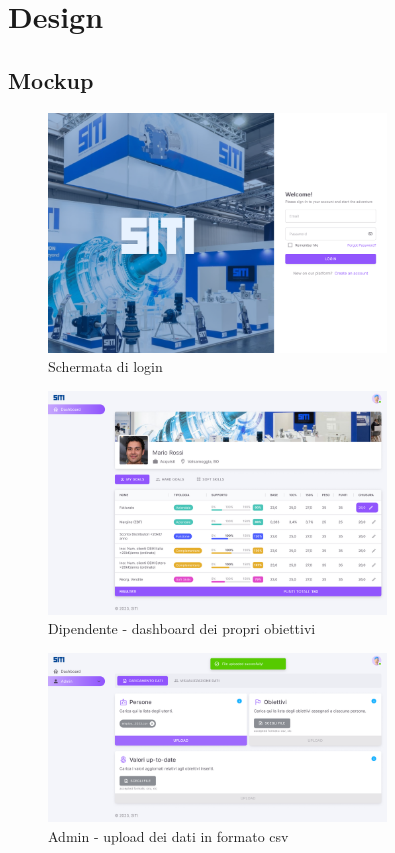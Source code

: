 \section*{Design}

\subsection*{Mockup}

\begin{figure}[h]
    \centering
    \includegraphics[width=0.8\textwidth]{res/login.png}
    \caption{Schermata di login}
    \label{fig:login}
\end{figure}

\begin{figure}
    \centering
    \includegraphics[width=0.8\textwidth]{res/dashboard.png}
    \caption{Dipendente - dashboard dei propri obiettivi}
    \label{fig:dashboard}
\end{figure}

\begin{figure}
    \centering
    \includegraphics[width=0.8\textwidth]{res/upload.png}
    \caption{Admin - upload dei dati in formato csv}
    \label{fig:upload}
\end{figure}

